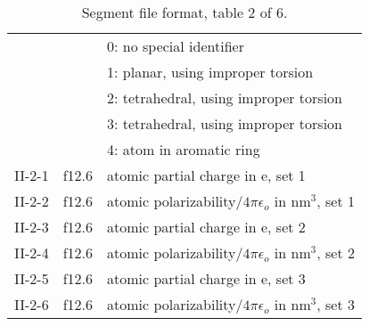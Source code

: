 \begin{table}[htbp]
\begin{center}
\begin{tabular*}{150mm}{p{15mm}p{12mm}l}
        &        & 0: no special identifier\\
        &        & 1: planar, using improper torsion\\
        &        & 2: tetrahedral, using improper torsion\\
        &        & 3: tetrahedral, using improper torsion\\
        &        & 4: atom in aromatic ring\\
II-2-1  & f12.6  & atomic partial charge in e, set 1\\
II-2-2  & f12.6  & atomic polarizability/$4\pi\epsilon_o$ in nm$^3$, set 1\\
II-2-3  & f12.6  & atomic partial charge in e, set 2\\
II-2-4  & f12.6  & atomic polarizability/$4\pi\epsilon_o$ in nm$^3$, set 2\\
II-2-5  & f12.6  & atomic partial charge in e, set 3\\
II-2-6  & f12.6  & atomic polarizability/$4\pi\epsilon_o$ in nm$^3$, set 3\\
\hline
\end{tabular*}
\caption{Segment file format, table 2 of 6.\label{tbl:nwaseg2}}
\end{center}
\end{table}

